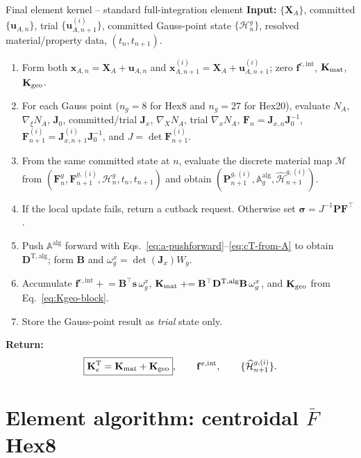 \documentclass[11pt,a4paper]{article}
\newcommand{\bs}[1]{\boldsymbol{#1}}
\newcommand{\F}{\bs{F}}
\newcommand{\Pstress}{\bs{P}}
\newcommand{\sig}{\bs{\sigma}}
\newcommand{\Aalg}{\mathbb{A}^{\mathrm{alg}}}
\newcommand{\vct}[1]{\mathbf{#1}}
\begin{document}
\begin{algorithmbox}{Final element kernel -- standard full-integration element}
\textbf{Input:} $\{\bs{X}_A\}$, committed $\{\bs{u}_{A,n}\}$, trial $\{\bs{u}_{A,n+1}^{(i)}\}$, committed Gauss-point state $\{\mathcal H_n^g\}$, resolved material/property data, $(t_n,t_{n+1})$.

\begin{enumerate}[leftmargin=1.7em,label=\arabic*.,itemsep=0.15em,topsep=0.2em]
\item Form both $\bs{x}_{A,n}=\bs{X}_A+\bs{u}_{A,n}$ and $\bs{x}_{A,n+1}^{(i)}=\bs{X}_A+\bs{u}_{A,n+1}^{(i)}$; zero $\vct f^{e,\mathrm{int}}$, $\vct K_{\rm mat}$, $\vct K_{\rm geo}$.
\item For each Gauss point ($n_g=8$ for Hex8 and $n_g=27$ for Hex20), evaluate $N_A$, $\nabla_\xi N_A$, $\vct J_0$, committed/trial $\vct J_x$, $\nabla_XN_A$, trial $\nabla_xN_A$, $\F_n=\vct J_{x,n}\vct J_0^{-1}$, $\F_{n+1}^{(i)}=\vct J_{x,n+1}^{(i)}\vct J_0^{-1}$, and $J=\det\F_{n+1}^{(i)}$.
\item From the same committed state at $n$, evaluate the discrete material map $\mathcal M$ from $(\F_n^g,\F_{n+1}^{g,(i)},\mathcal H_n^g,t_n,t_{n+1})$ and obtain $(\Pstress_{n+1}^{g,(i)},\Aalg_g,\widehat{\mathcal H}_{n+1}^{g,(i)})$.
\item If the local update fails, return a cutback request. Otherwise set $\sig=J^{-1}\Pstress\F^\top$.
\item Push $\Aalg$ forward with Eqs.~\eqref{eq:a-pushforward}--\eqref{eq:cT-from-A} to obtain $\vct D^{\mathrm{T,alg}}$; form $\vct B$ and $\omega_g^x=\det(\vct J_x)W_g$.
\item Accumulate $\vct f^{e,\mathrm{int}}\mathrel{+}=\vct B^\top\vct s\,\omega_g^x$, $\vct K_{\rm mat}\mathrel{+}=\vct B^\top\vct D^{\mathrm{T,alg}}\vct B\,\omega_g^x$, and $\vct K_{\rm geo}$ from Eq.~\eqref{eq:Kgeo-block}.
\item Store the Gauss-point result as \emph{trial} state only.
\end{enumerate}
\textbf{Return:}
\[
\boxed{\vct K_e^{\mathrm T}=\vct K_{\rm mat}+\vct K_{\rm geo}},
\qquad
\vct f^{e,\mathrm{int}},
\qquad
\{\widehat{\mathcal H}_{n+1}^{g,(i)}\}.
\]
\end{algorithmbox}


\section{Element algorithm: centroidal \texorpdfstring{$\bar F$}{F-bar} Hex8}
\label{sec:algo-Fbar}
\end{document}
